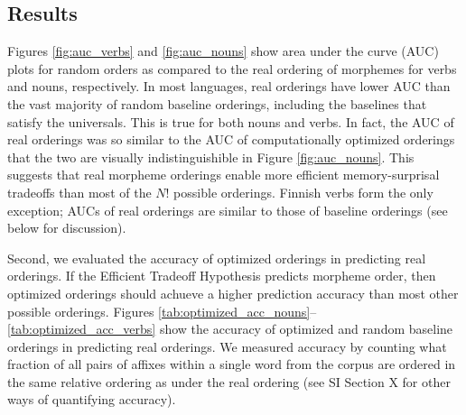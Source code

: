 \documentclass[11pt,letterpaper]{article}
\newcommand{\citet}{\Textcite}
\newcommand\becky[1]{{\color{blue}(#1)}}
\newcounter{def}
\begin{document}



\subsection{Results}

Figures \ref{fig:auc_verbs} and \ref{fig:auc_nouns} show area under the curve (AUC) plots for random orders as compared to the real ordering of morphemes for verbs and nouns, respectively.
In most languages, real orderings have lower AUC than the vast majority of random baseline orderings, including the baselines that satisfy the universals. This is true for both nouns and verbs. In fact, the AUC of real orderings was so similar to the AUC of computationally optimized orderings that the two are visually indistinguishible in Figure  \ref{fig:auc_nouns}. This suggests that real morpheme orderings enable more efficient memory-surprisal tradeoffs than most of the $N!$ possible orderings.
Finnish verbs form the only exception; AUCs of real orderings are similar to those of baseline orderings (see below for discussion).

Second, we evaluated the accuracy of optimized orderings in predicting real orderings.
If the Efficient Tradeoff Hypothesis predicts morpheme order, then optimized orderings should achueve a higher prediction accuracy than most other possible orderings.
Figures \ref{tab:optimized_acc_nouns}--\ref{tab:optimized_acc_verbs} show the accuracy of optimized and random baseline orderings in predicting real orderings. 
We measured accuracy by counting what fraction of all pairs of affixes within a single word from the corpus are ordered in the same relative ordering as under the real ordering (see SI Section X for other ways of quantifying accuracy).
\end{document}
